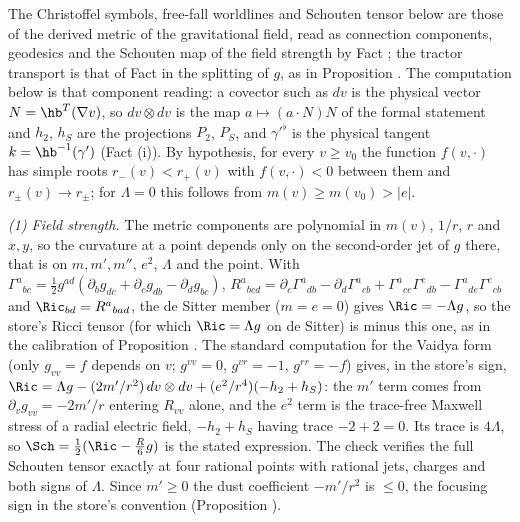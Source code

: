 The Christoffel symbols, free-fall worldlines and Schouten tensor below are those of the derived metric of the gravitational field, read as connection components, geodesics and the Schouten map of the field strength by Fact ; the tractor transport is that of Fact  in the splitting of $g$, as in Proposition . The computation below is that component reading: a covector such as $dv$ is the physical vector $N = \hb^{T}(\nabla v)$, so $dv\otimes dv$ is the map $a \mapsto (a\cdot N)N$ of the formal statement and $h_{2}$, $h_{S}$ are the projections $P_{2}$, $P_{S}$, and $\gamma'^{\flat}$ is the physical tangent $k = \hb^{-1}(\gamma')$ (Fact (i)). By hypothesis, for every $v \ge v_{0}$ the function $f(v, \cdot)$ has simple roots $r_{-}(v) < r_{+}(v)$ with $f(v, \cdot) < 0$ between them and $r_{\pm}(v) \to r_{\pm}$; for $\Lambda = 0$ this follows from $m(v) \ge m(v_{0}) > |e|$.

\emph{(1) Field strength.} The metric components are polynomial in $m(v)$, $1/r$, $r$ and $x, y$, so the curvature at a point depends only on the second-order jet of $g$ there, that is on $m, m', m''$, $e^{2}$, $\Lambda$ and the point. With $\Gamma^{a}{}_{bc} = \frac12 g^{ad}(\partial_{b}g_{dc} + \partial_{c}g_{db} - \partial_{d}g_{bc})$, $R^{a}{}_{bcd} = \partial_{c}\Gamma^{a}{}_{db} - \partial_{d}\Gamma^{a}{}_{cb} + \Gamma^{a}{}_{ce}\Gamma^{e}{}_{db} - \Gamma^{a}{}_{de}\Gamma^{e}{}_{cb}$ and $\Ric_{bd} = R^{a}{}_{bad}$, the de Sitter member ($m = e = 0$) gives $\Ric = -\Lambda g$, so the store's Ricci tensor (for which $\Ric = \Lambda g$ on de Sitter) is minus this one, as in the calibration of Proposition . The standard computation for the Vaidya form (only $g_{vv} = f$ depends on $v$; $g^{vv} = 0$, $g^{vr} = -1$, $g^{rr} = -f$) gives, in the store's sign, $\Ric = \Lambda g - (2m'/r^{2})\,dv\otimes dv + (e^{2}/r^{4})(-h_{2} + h_{S})$: the $m'$ term comes from $\partial_{v}g_{vv} = -2m'/r$ entering $R_{vv}$ alone, and the $e^{2}$ term is the trace-free Maxwell stress of a radial electric field, $-h_{2} + h_{S}$ having trace $-2 + 2 = 0$. Its trace is $4\Lambda$, so $\Sch = \frac12(\Ric - \frac{R}{6}g)$ is the stated expression. The check verifies the full Schouten tensor exactly at four rational points with rational jets, charges and both signs of $\Lambda$. Since $m' \ge 0$ the dust coefficient $-m'/r^{2}$ is $\le 0$, the focusing sign in the store's convention (Proposition ).

